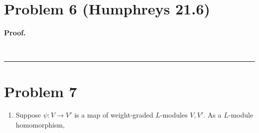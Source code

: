 \documentclass[12pt]{article}%
\newenvironment{proof}[1][Proof]{\textbf{#1.} }{\ \rule{0.5em}{0.5em}}
\begin{document}
\section*{Problem 6 (Humphreys 21.6)}
\begin{proof}

\end{proof}

\section*{Problem 7}
\begin{enumerate}
  \item Suppose $\psi: V \rightarrow V'$ is a map of weight-graded $L$-modules $V,V'$. As a $L$-module homomorphism, 
\end{enumerate}
\end{document}

